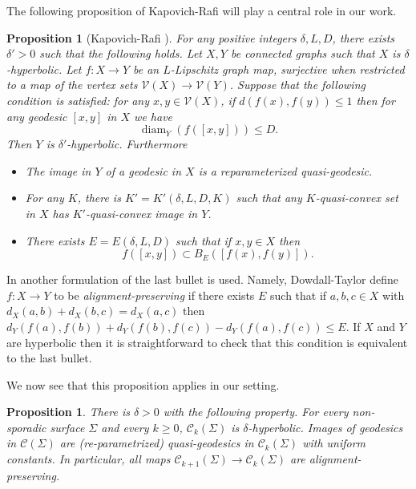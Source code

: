 \documentclass[11pt]{article}
\newtheorem{prop}[thm]{Proposition}
\theoremstyle{remark}
\def\diam{\operatorname{diam}}
\def\C{{\mathcal C}}
\begin{document}
The following proposition of Kapovich-Rafi will play a central role in our work.
\begin{prop}[{Kapovich-Rafi \cite[Proposition 2.5]{KR}}]
\label{KR}
For any positive integers $\delta,L,D$, there exists $\delta'>0$
such that the following holds.
Let $X,Y$ be connected graphs such that $X$ is $\delta$-hyperbolic.
Let $f:X\to Y$ be an $L$-Lipschitz graph map, surjective when restricted
to a map of the vertex sets $\mathcal{V}(X)\to \mathcal{V}(Y)$.
Suppose that the following condition is
satisfied:
for any $x,y\in \mathcal{V}(X)$, if $d(f(x),f(y))\leq 1$ then for any geodesic $[x,y]$
in $X$ we have
\[
\diam_Y(f([x,y])) \leq D.
\]
Then $Y$ is $\delta'$-hyperbolic.
Furthermore
\begin{itemize}
\item The image in $Y$ of a geodesic in $X$ is a reparameterized quasi-geodesic.

\item For any $K$, there is $K' = K'(\delta, L, D, K)$ such that any
$K$-quasi-convex set in $X$ has $K'$-quasi-convex image in $Y$.

\item There exists $E=E(\delta,L,D)$ such that if $x,y \in X$ then
$$f([x,y]) \subset B_E([f(x), f(y)]).$$
\end{itemize}
\end{prop}

In \cite{DT} another formulation of the last bullet is used.
Namely, Dowdall-Taylor define $f\colon X\to Y$ to be {\em alignment-preserving}
if there exists $E$ such that if $a,b,c \in X$ with
$d_X(a,b) + d_X(b,c) = d_X(a,c)$ then
$d_Y(f(a), f(b)) + d_Y(f(b), f(c)) - d_Y(f(a), f(c))\leq E$. If
$X$ and $Y$ are hyperbolic then it is straightforward to check that this
condition is equivalent to the last bullet.

We now see that this proposition applies in our setting.

\begin{prop}\label{hyperbolic}
  There is $\delta>0$ with the following property.
  For every non-sporadic surface $\Sigma$ and every $k\geq 0$, $\mathcal
    C_{k}(\Sigma)$ is $\delta$-hyperbolic. Images of geodesics in $\mathcal
    C(\Sigma)$ are (re-parametrized) quasi-geodesics in $\mathcal
    C_{k}(\Sigma)$ with uniform constants. In particular, all maps
    $\C_{k+1}(\Sigma) \to \C_k(\Sigma)$ are alignment-preserving.
\end{prop}
\end{document}

